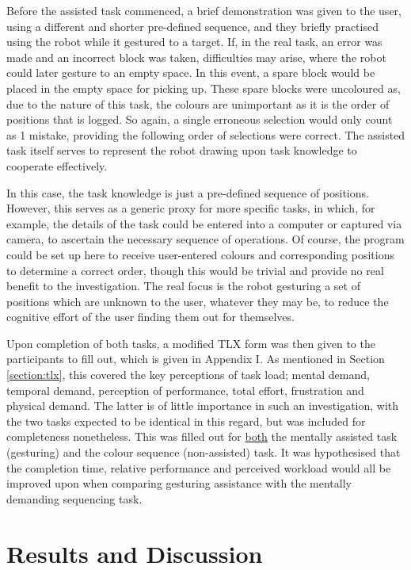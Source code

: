 \documentclass[11pt]{article}
\begin{document}
Before the assisted task commenced, a brief demonstration was given to the user, using a different and shorter pre-defined sequence, and they briefly practised using the robot while it gestured to a target. If, in the real task, an error was made and an incorrect block was taken, difficulties may arise, where the robot could later gesture to an empty space. In this event, a spare block would be placed in the empty space for picking up. These spare blocks were uncoloured as, due to the nature of this task, the colours are unimportant as it is the order of positions that is logged. So again, a single erroneous selection would only count as 1 mistake, providing the following order of selections were correct. The assisted task itself serves to represent the robot drawing upon task knowledge to cooperate effectively. 

In this case, the task knowledge is just a pre-defined sequence of positions. However, this serves as a generic proxy for more specific tasks, in which, for example, the details of the task could be entered into a computer or captured via camera, to ascertain the necessary sequence of operations. Of course, the program could be set up here to receive user-entered colours and corresponding positions to determine a correct order, though this would be trivial and provide no real benefit to the investigation. The real focus is the robot gesturing a set of positions which are unknown to the user, whatever they may be, to reduce the cognitive effort of the user finding them out for themselves.

Upon completion of both tasks, a modified TLX form was then given to the participants to fill out, which is given in Appendix I. As mentioned in Section \ref{section:tlx}, this covered the key perceptions of task load; mental demand, temporal demand, perception of performance, total effort, frustration and physical demand. The latter is of little importance in such an investigation, with the two tasks expected to be identical in this regard, but was included for completeness nonetheless. This was filled out for \underline{both} the mentally assisted task (gesturing) and the colour sequence (non-assisted) task. It was hypothesised that the completion time, relative performance and perceived workload would all be improved upon when comparing gesturing assistance with the mentally demanding sequencing task.


\pagebreak
{}
\section{Results and Discussion}
\end{document}
